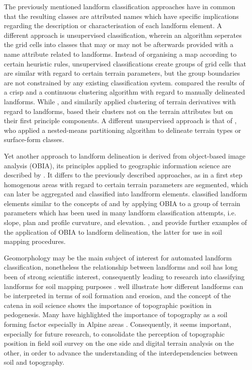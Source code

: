 \documentclass[final,1p,times,twocolumn,authoryear]{elsarticle}
\begin{document}
The previously mentioned landform classification approaches have in common that the resulting classes  are attributed names which have specific implications regarding the description or characterisation of each landform element. A different approach is unsupervised classification, wherein an algorithm seperates the grid cells into classes that may or may not be afterwards provided with a name attribute related to landforms. Instead of organising a map according to certain heuristic rules, unsupervised classifications create groups of grid cells that are similar with regard to certain terrain parameters, but the group boundaries are not constrained by any existing classification system. \cite{Irvin1997} compared the results of a crisp and a continuous clustering algorithm with regard to manually delineated landforms.  While \cite{Adediran2004}, \cite{Arrell2007} and \cite{Burrough2000a}  similarily applied clustering of terrain derivatives with regard to landforms, \cite{Moravej2012} based their clusters not on the terrain attributes but on their first principle components. A different unsupervised approach is that of  \cite{Iwahashi2007}, who applied a nested-means partitioning algorithm to delineate terrain types or surface-form classes.

Yet another approach to landform delineation is derived from object-based image analysis (OBIA), its principles applied to geographic information science are described by \cite{Blaschke2014}. It differs to the previously described approaches, as in a first step homogenous areas with regard to certain terrain parameters are segmented, which can later be aggregated and classified into landfrorm elements. \cite{Dragut2006} classified landform elements similar to the concepts of \cite{Dikau1988} and \cite{Pennock1987} by applying OBIA  to a group of terrain parameters which has been used in many landform classification attempts, i.e. slope, plan and profile curvature, and  elevation. \cite{Gercek2011}, \cite{Mashimbye2014} and \cite{Kringer2009}  provide further examples of the application of OBIA to landform delineation, the latter for use in soil mapping procedures.

Geomorphology may be the main subject of interest for automated landform classification, nonetheless the relationship between landforms and soil has long been of strong scientific interest, consequently leading to research into classifying landforms for soil mapping purposes \citep{Schmidt2004,Herbst2012,Hughes2009, Barringer2008}. \cite{MacMillan2000a} well illustrate how different landforms can be interpreted in terms of soil formation and erosion, and the concept of the catena in soil science \citep{Schaetzl2013} shows the importance of topographic position in pedogenesis. Many have highlighted the importance of topography as a soil forming factor especially in Alpine areas \citep{Geitner2011,Herbst2012}. Consequently, it seems important, especially for future research, to consolidate the perception of topographic position in field soil survey on the one side and digital terrain analysis on the other, in order to advance the understanding of the interdependencies between soil and topography.
\end{document}
